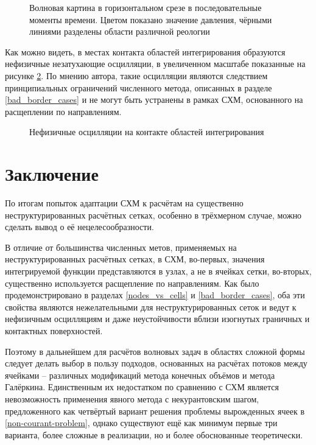 \begin{figure}[H]
\begin{subfigure}{.3\textwidth}
\end{subfigure}
\caption{Волновая картина в горизонтальном срезе в последовательные моменты времени. 
Цветом показано значение давления, чёрными линиями разделены области различной реологии}
\label{fig:waves-z}
\end{figure}
Как можно видеть, в местах контакта областей интегрирования 
образуются нефизичные незатухающие осцилляции, в увеличенном масштабе показанные на рисунке 
\ref{pic:oscillations}. По мнению автора, такие осцилляции являются следствием принципиальных 
ограничений численного метода, описанных в разделе \ref{bad_border_cases} и 
не могут быть устранены в рамках СХМ, основанного на расщеплении по направлениям. 
\begin{figure}[H]
	\caption{Нефизичные осцилляции на контакте областей интегрирования}
	\label{pic:oscillations}
\end{figure}


\section{Заключение}
По итогам попыток адаптации СХМ к расчётам на существенно неструктурированных расчётных 
сетках, особенно в трёхмерном случае, можно сделать вывод о её нецелесообразности.

В отличие от большинства численных метов, 
применяемых на неструктурированных расчётных сетках, в СХМ, 
во-первых, значения интегрируемой функции представляются в узлах, а не в ячейках сетки, 
во-вторых, существенно используется расщепление по направлениям. 
Как было продемонстрировано в разделах \ref{nodes_vs_cells} и \ref{bad_border_cases}, 
оба эти свойства являются нежелательными для неструктурированных сеток 
и ведут к нефизичным осцилляциям и даже неустойчивости вблизи 
изогнутых граничных и контактных поверхностей. 

Поэтому в дальнейшем для расчётов волновых задач в областях сложной формы 
следует делать выбор в пользу подходов, основанных на расчётах потоков между ячейками -- 
различных модификаций метода конечных объёмов и метода Галёркина. 
Единственным их недостатком по сравнению с СХМ является невозможность 
применения явного метода с некурантовским шагом, 
предложенного как четвёртый вариант решения проблемы вырожденных ячеек в \ref{non-courant-problem}, 
однако существуют ещё как минимум первые три варианта, более сложные в реализации, 
но и более обоснованные теоретически. 


